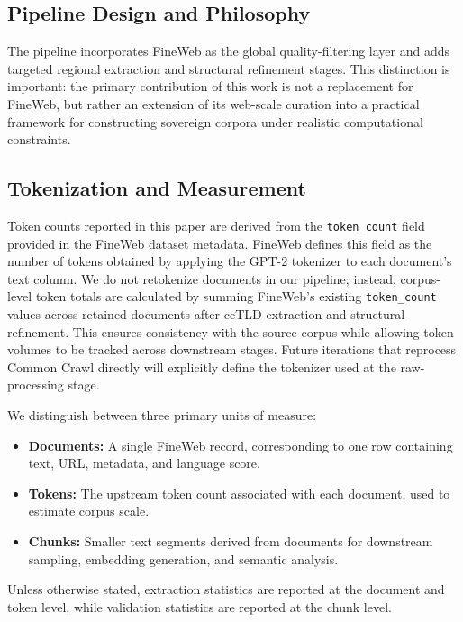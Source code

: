 \documentclass[11pt, a4paper]{article}
\begin{document}
\subsection{Pipeline Design and Philosophy}

The pipeline incorporates FineWeb as the global quality-filtering layer and adds targeted regional extraction and structural refinement stages. This distinction is important: the primary contribution of this work is not a replacement for FineWeb, but rather an extension of its web-scale curation into a practical framework for constructing sovereign corpora under realistic computational constraints.

\subsection{Tokenization and Measurement}

Token counts reported in this paper are derived from the \texttt{token\_count} field provided in the FineWeb dataset metadata. FineWeb defines this field as the number of tokens obtained by applying the GPT-2 tokenizer to each document's text column. We do not retokenize documents in our pipeline; instead, corpus-level token totals are calculated by summing FineWeb's existing \texttt{token\_count} values across retained documents after ccTLD extraction and structural refinement. This ensures consistency with the source corpus while allowing token volumes to be tracked across downstream stages. Future iterations that reprocess Common Crawl directly will explicitly define the tokenizer used at the raw-processing stage.

We distinguish between three primary units of measure:

\begin{itemize}[noitemsep]
    \item \textbf{Documents:} A single FineWeb record, corresponding to one row containing text, URL, metadata, and language score.
    \item \textbf{Tokens:} The upstream token count associated with each document, used to estimate corpus scale.
    \item \textbf{Chunks:} Smaller text segments derived from documents for downstream sampling, embedding generation, and semantic analysis.
\end{itemize}

Unless otherwise stated, extraction statistics are reported at the document and token level, while validation statistics are reported at the chunk level.
\end{document}
